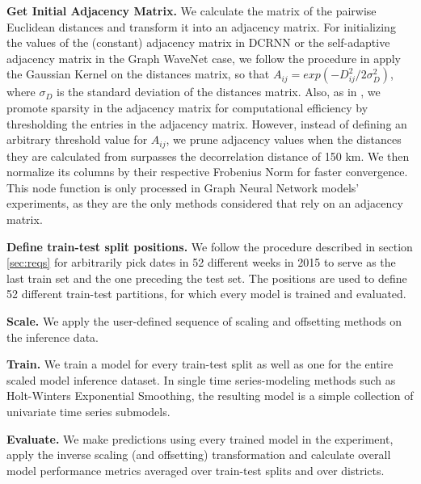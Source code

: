 \vspace{1em}
\noindent
\textbf{Get Initial Adjacency Matrix.}  We calculate the matrix of the pairwise Euclidean distances and transform it into an adjacency matrix.
For initializing the values of the (constant) adjacency matrix in DCRNN or the self-adaptive adjacency matrix in the Graph WaveNet case, we follow the procedure in \cite{li2018dcrnn, wu2019graphwavenet} apply the Gaussian Kernel on the distances matrix, so that $A_{ij} = exp(-D_{ij}^2/2\sigma_{D}^2)$, where $\sigma_{D}$ is the standard deviation of the distances matrix.
Also, as in \cite{li2018dcrnn}, we promote sparsity in the adjacency matrix for computational efficiency by thresholding the entries in the adjacency matrix.
However, instead of defining an arbitrary threshold value for $A_{ij}$, we prune adjacency values when the distances they are calculated from surpasses the decorrelation distance of 150 km.
We then normalize its columns by their respective Frobenius Norm for faster convergence.
This node function is only processed in Graph Neural Network models' experiments, as they are the only methods considered that rely on an adjacency matrix.

\vspace{1em}
\noindent
\textbf{Define train-test split positions.} We follow the procedure described in section \ref{sec:reqs} for arbitrarily pick dates in 52 different weeks in 2015 to serve as the last train set and the one preceding the test set.
The positions are used to define 52 different train-test partitions, for which every model is trained and evaluated.

\vspace{1em}
\noindent
\textbf{Scale.}  We apply the user-defined sequence of scaling and offsetting methods on the inference data.

\vspace{1em}
\noindent
\textbf{Train.}  We train a model for every train-test split as well as one for the entire scaled model inference dataset.
In single time series-modeling methods such as Holt-Winters Exponential Smoothing, the resulting model is a simple collection of univariate time series submodels.

\vspace{1em}
\noindent
\textbf{Evaluate.}  We make predictions using every trained model in the experiment, apply the inverse scaling (and offsetting) transformation and calculate overall model performance metrics averaged over train-test splits and over districts.
